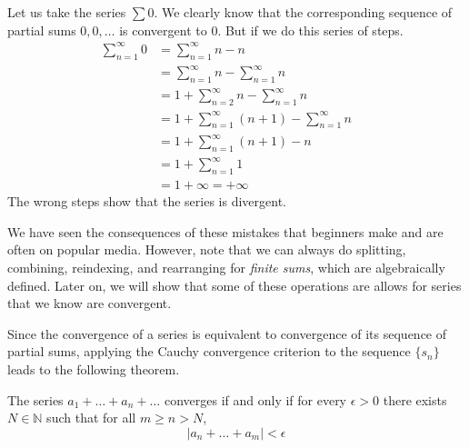   \begin{example}
    Let us take the series $\sum 0$. We clearly know that the corresponding sequence of partial sums $0, 0, \ldots$ is convergent to $0$. But if we do this series of steps. 
    \begin{align}
      \sum_{n=1}^\infty 0 & = \sum_{n=1}^\infty n - n && \tag{Can manipulate terms} \\
                          & = \sum_{n=1}^\infty n - \sum_{n=1}^\infty n && \tag{Cannot split series} \\ 
                          & = 1 + \sum_{n=2}^\infty n - \sum_{n=1}^\infty n && \tag{Can take 1st term out} \\ 
                          & = 1 + \sum_{n=1}^\infty (n+1) - \sum_{n=1}^\infty n && \tag{Cannot reindexing} \\
                          & = 1 + \sum_{n=1}^\infty (n+1) - n  && \tag{Cannot combine series} \\
                          & = 1 + \sum_{n=1}^\infty 1 && \tag{Can manipulate terms} \\
                          & = 1 + \infty = +\infty
    \end{align}
    The wrong steps show that the series is divergent. 
  \end{example} 

  We have seen the consequences of these mistakes that beginners make and are often on popular media. However, note that we can always do splitting, combining, reindexing, and rearranging for \textit{finite sums}, which are algebraically defined. Later on, we will show that some of these operations are allows for series that we know are convergent.  

  Since the convergence of a series is equivalent to convergence of its sequence of partial sums, applying the Cauchy convergence criterion to the sequence $\{s_n\}$ leads to the following theorem. 

  \begin{theorem}
    The series $a_1 + \ldots + a_n + \ldots$ converges if and only if for every $\epsilon > 0$ there exists $N \in \mathbb{N}$ such that for all $m \geq n > N$, 
    \begin{equation}
      |a_n + \ldots + a_m| < \epsilon
    \end{equation}
  \end{theorem}

